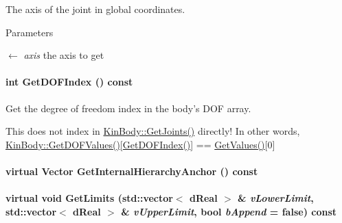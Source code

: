 The axis of the joint in global coordinates. 


\begin{DoxyParams}{Parameters}
\item[\mbox{$\leftarrow$} {\em axis}]the axis to get \end{DoxyParams}
\hypertarget{classOpenRAVE_1_1KinBody_1_1Joint_aa008d1863733a137b9a417d8e5277bb0}{
\paragraph[{GetDOFIndex}]{\setlength{\rightskip}{0pt plus 5cm}int GetDOFIndex () const}\hfill}
\label{classOpenRAVE_1_1KinBody_1_1Joint_aa008d1863733a137b9a417d8e5277bb0}


Get the degree of freedom index in the body's DOF array. 

This does not index in \hyperlink{classOpenRAVE_1_1KinBody_a01fcab06f416b2ac3bac1385e09ff9bf}{KinBody::GetJoints()} directly! In other words, \hyperlink{classOpenRAVE_1_1KinBody_aa07f040a19a9fe7b80254915b1cce26b}{KinBody::GetDOFValues()}\mbox{[}\hyperlink{classOpenRAVE_1_1KinBody_1_1Joint_aa008d1863733a137b9a417d8e5277bb0}{GetDOFIndex()}\mbox{]} == \hyperlink{classOpenRAVE_1_1KinBody_1_1Joint_a04a882646ae62c1d8b2416bd525a18dc}{GetValues()}\mbox{[}0\mbox{]} \hypertarget{classOpenRAVE_1_1KinBody_1_1Joint_a44ecb796397334c930f7e4dbb26a9f83}{
\paragraph[{GetInternalHierarchyAnchor}]{\setlength{\rightskip}{0pt plus 5cm}virtual Vector GetInternalHierarchyAnchor () const}\hfill}
\label{classOpenRAVE_1_1KinBody_1_1Joint_a44ecb796397334c930f7e4dbb26a9f83}
\hypertarget{classOpenRAVE_1_1KinBody_1_1Joint_a9cbbcd5d35fb3830b35c33f244570566}{
\paragraph[{GetLimits}]{\setlength{\rightskip}{0pt plus 5cm}virtual void GetLimits (std::vector$<$ dReal $>$ \& {\em vLowerLimit}, \/  std::vector$<$ dReal $>$ \& {\em vUpperLimit}, \/  bool {\em bAppend} = {\ttfamily false}) const}\hfill}
\label{classOpenRAVE_1_1KinBody_1_1Joint_a9cbbcd5d35fb3830b35c33f244570566}


